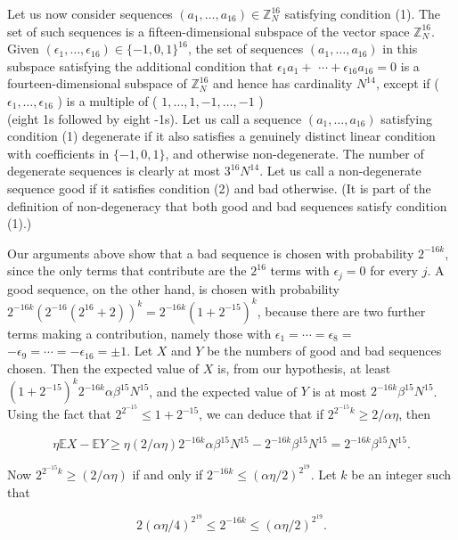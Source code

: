 \documentclass[10pt]{article}
\begin{document}
Let us now consider sequences $\left(a_{1}, \ldots, a_{16}\right) \in \mathbb{Z}_{N}^{16}$ satisfying condition (1). The set of such sequences is a fifteen-dimensional subspace of the vector space $\mathbb{Z}_{N}^{16}$. Given $\left(\epsilon_{1}, \ldots, \epsilon_{16}\right) \in\{-1,0,1\}^{16}$, the set of sequences $\left(a_{1}, \ldots, a_{16}\right)$ in this subspace satisfying the additional condition that $\epsilon_{1} a_{1}+$ $\cdots+\epsilon_{16} a_{16}=0$ is a fourteen-dimensional subspace of $\mathbb{Z}_{N}^{16}$ and hence has cardinality $N^{14}$, except if ( $\epsilon_{1}, \ldots, \epsilon_{16}$ ) is a multiple of ( $1, \ldots, 1,-1, \ldots,-1$ )\\
(eight 1s followed by eight -1s). Let us call a sequence $\left(a_{1}, \ldots, a_{16}\right)$ satisfying condition (1) degenerate if it also satisfies a genuinely distinct linear condition with coefficients in $\{-1,0,1\}$, and otherwise non-degenerate. The number of degenerate sequences is clearly at most $3^{16} N^{14}$. Let us call a non-degenerate sequence good if it satisfies condition (2) and bad otherwise. (It is part of the definition of non-degeneracy that both good and bad sequences satisfy condition (1).)

Our arguments above show that a bad sequence is chosen with probability $2^{-16 k}$, since the only terms that contribute are the $2^{16}$ terms with $\epsilon_{j}=0$ for every $j$. A good sequence, on the other hand, is chosen with probability $2^{-16 k}\left(2^{-16}\left(2^{16}+2\right)\right)^{k}=2^{-16 k}\left(1+2^{-15}\right)^{k}$, because there are two further terms making a contribution, namely those with $\epsilon_{1}=\cdots=\epsilon_{8}=$ $-\epsilon_{9}=\cdots=-\epsilon_{16}= \pm 1$. Let $X$ and $Y$ be the numbers of good and bad sequences chosen. Then the expected value of $X$ is, from our hypothesis, at least $\left(1+2^{-15}\right)^{k} 2^{-16 k} \alpha \beta^{15} N^{15}$, and the expected value of $Y$ is at most $2^{-16 k} \beta^{15} N^{15}$. Using the fact that $2^{2^{-15}} \leqslant 1+2^{-15}$, we can deduce that if $2^{2^{-15} k} \geqslant 2 / \alpha \eta$, then

$$
\eta \mathbb{E} X-\mathbb{E} Y \geqslant \eta(2 / \alpha \eta) 2^{-16 k} \alpha \beta^{15} N^{15}-2^{-16 k} \beta^{15} N^{15}=2^{-16 k} \beta^{15} N^{15} .
$$

Now $2^{2^{-15} k} \geqslant(2 / \alpha \eta)$ if and only if $2^{-16 k} \leqslant(\alpha \eta / 2)^{2^{19}}$. Let $k$ be an integer such that

$$
2(\alpha \eta / 4)^{2^{19}} \leqslant 2^{-16 k} \leqslant(\alpha \eta / 2)^{2^{19}} .
$$
\end{document}
